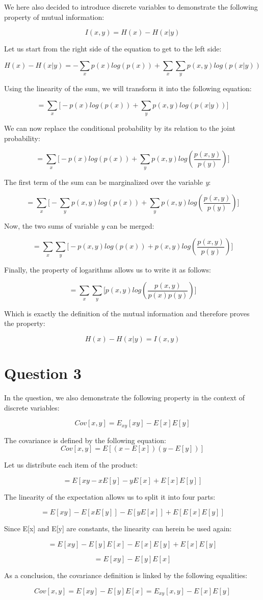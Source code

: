 \documentclass{article}
\begin{document}
We here also decided to introduce discrete variables to demonstrate the following property of mutual information:

$$I(x,y) = H(x) - H(x|y)$$

Let us start from the right side of the equation to get to the left side:

$$H(x) - H(x|y) = -\sum_{x}{p(x)log(p(x))} + \sum_{x}{\sum_{y}{p(x,y)log(p(x|y))}}$$

Using the linearity of the sum, we will transform it into the following equation:

$$= \sum_{x}{\Big[-p(x)log(p(x)) + \sum_{y}{p(x,y)log(p(x|y))}\Big]}$$

We can now replace the conditional probability by its relation to the joint probability:

$$= \sum_{x}{\Big[-p(x)log(p(x)) + \sum_{y}{p(x,y)log(\frac{p(x,y)}{p(y)})}\Big]}$$

The first term of the sum can be marginalized over the variable \textit {y}:

$$= \sum_{x}{\Big[-\sum_{y}{p(x,y)log(p(x))} + \sum_{y}{p(x,y)log(\frac{p(x,y)}{p(y)})}\Big]}$$

Now, the two sums of variable \textit {y} can be merged:

$$= \sum_{x}{\sum_{y}{\Big[-p(x,y)log(p(x))+p(x,y)log(\frac{p(x,y)}{p(y)})\Big]}}$$

Finally, the property of logarithms allows us to write it as follows:

$$= \sum_{x}{\sum_{y}{\Big[p(x,y)log(\frac{p(x,y)}{p(x)p(y)})\Big]}}$$

Which is exactly the definition of the mutual information and therefore proves the property:

$$\boxed{H(x) - H(x|y) = I(x,y)}$$

\section*{Question 3}

In the question, we also demonstrate the following property in the context of discrete variables:

$$Cov[x,y] = E_{xy}[xy] - E[x]E[y]$$

The covariance is defined by the following equation:
$$Cov[x,y] = E[(x-E[x])(y-E[y])]$$

Let us distribute each item of the product:

$$= E[xy - xE[y] - yE[x] + E[x]E[y]]$$

The linearity of the expectation allows us to split it into four parts:

$$= E[xy] - E[xE[y]] - E[yE[x]] + E[E[x]E[y]]$$

Since E[x] and E[y] are constants, the linearity can herein be used again:

$$= E[xy] - E[y]E[x] - E[x]E[y] + E[x]E[y]$$

$$= E[xy] - E[y]E[x]$$

As a conclusion, the covariance definition is linked by the following equalities:

$$\boxed{Cov[x,y] = E[xy] - E[y]E[x]
                             = E_{xy}[x,y] - E[x]E[y]}$$
\end{document}
